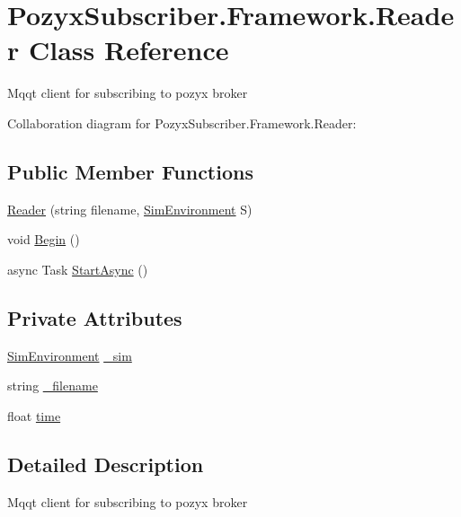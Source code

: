 \hypertarget{class_pozyx_subscriber_1_1_framework_1_1_reader}{}\section{Pozyx\+Subscriber.\+Framework.\+Reader Class Reference}
\label{class_pozyx_subscriber_1_1_framework_1_1_reader}


Mqqt client for subscribing to pozyx broker  




Collaboration diagram for Pozyx\+Subscriber.\+Framework.\+Reader\+:
\subsection*{Public Member Functions}
\begin{DoxyCompactItemize}
\item 
\hyperlink{class_pozyx_subscriber_1_1_framework_1_1_reader_a34b6d7d372c71c7811229d42ce07e31f}{Reader} (string filename, \hyperlink{class_pozyx_subscriber_1_1_sim_environment}{Sim\+Environment} S)
\item 
void \hyperlink{class_pozyx_subscriber_1_1_framework_1_1_reader_afb1a43eb336971690e2c3fde43947b1d}{Begin} ()
\item 
async Task \hyperlink{class_pozyx_subscriber_1_1_framework_1_1_reader_a41ad44c9590bacac708e2ed4a24d56b2}{Start\+Async} ()
\end{DoxyCompactItemize}
\subsection*{Private Attributes}
\begin{DoxyCompactItemize}
\item 
\hyperlink{class_pozyx_subscriber_1_1_sim_environment}{Sim\+Environment} \hyperlink{class_pozyx_subscriber_1_1_framework_1_1_reader_a2105f5c7ce04e3a24ca3113f97f500b2}{\+\_\+sim}
\item 
string \hyperlink{class_pozyx_subscriber_1_1_framework_1_1_reader_ac76e24779e67f985f38d3d5070cb0535}{\+\_\+filename}
\item 
float \hyperlink{class_pozyx_subscriber_1_1_framework_1_1_reader_a19c48a4c5be9fb991299d29d7378bbee}{time}
\end{DoxyCompactItemize}


\subsection{Detailed Description}
Mqqt client for subscribing to pozyx broker 



